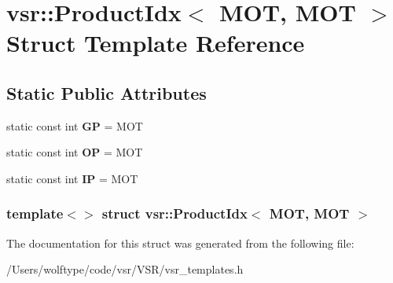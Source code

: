 \hypertarget{structvsr_1_1_product_idx_3_01_m_o_t_00_01_m_o_t_01_4}{\section{vsr\-:\-:Product\-Idx$<$ M\-O\-T, M\-O\-T $>$ Struct Template Reference}
\label{structvsr_1_1_product_idx_3_01_m_o_t_00_01_m_o_t_01_4}
}
\subsection*{Static Public Attributes}
\begin{DoxyCompactItemize}
\item 
\hypertarget{structvsr_1_1_product_idx_3_01_m_o_t_00_01_m_o_t_01_4_a2a4d992608d2a771c0d4cc42f92a070d}{static const int {\bfseries G\-P} = M\-O\-T}\label{structvsr_1_1_product_idx_3_01_m_o_t_00_01_m_o_t_01_4_a2a4d992608d2a771c0d4cc42f92a070d}

\item 
\hypertarget{structvsr_1_1_product_idx_3_01_m_o_t_00_01_m_o_t_01_4_a1bb0afa2e903a15443ff6c8f5511ebdc}{static const int {\bfseries O\-P} = M\-O\-T}\label{structvsr_1_1_product_idx_3_01_m_o_t_00_01_m_o_t_01_4_a1bb0afa2e903a15443ff6c8f5511ebdc}

\item 
\hypertarget{structvsr_1_1_product_idx_3_01_m_o_t_00_01_m_o_t_01_4_a547dad5f98335be8b33c6db6b936095e}{static const int {\bfseries I\-P} = M\-O\-T}\label{structvsr_1_1_product_idx_3_01_m_o_t_00_01_m_o_t_01_4_a547dad5f98335be8b33c6db6b936095e}

\end{DoxyCompactItemize}
\subsubsection*{template$<$$>$ struct vsr\-::\-Product\-Idx$<$ M\-O\-T, M\-O\-T $>$}



The documentation for this struct was generated from the following file\-:\begin{DoxyCompactItemize}
\item 
/\-Users/wolftype/code/vsr/\-V\-S\-R/vsr\-\_\-templates.\-h\end{DoxyCompactItemize}
